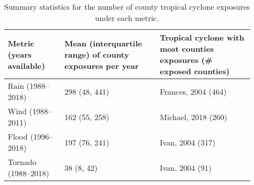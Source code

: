 \begin{table}[ht]
\centering
\caption{Summary statistics for the number of county tropical cyclone exposures under each metric.} 
\label{tab:exposuresummaries}
\begin{tabular}{p{4.5cm}p{4.5cm}p{4.5cm}}
  \toprule
Metric (years available) & Mean (interquartile range) of county exposures per year & Tropical cyclone with most counties exposures (\# exposed counties) \\ 
  \midrule
Rain (1988--2018) & 298 (48, 441) & Frances, 2004 (464) \\ 
  Wind (1988--2011) & 162 (55, 258) & Michael, 2018 (260) \\ 
  Flood (1996--2018) & 197 (76, 241) & Ivan, 2004 (317) \\ 
  Tornado (1988--2018) & 38 (8, 42) & Ivan, 2004 (91) \\ 
   \bottomrule
\end{tabular}
\end{table}
